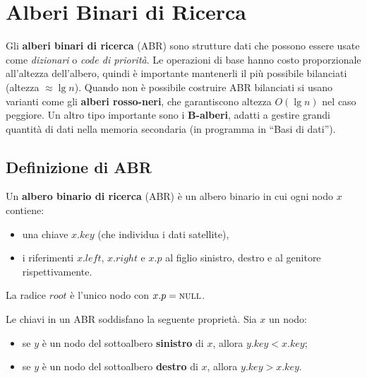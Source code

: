 \section{Alberi Binari di Ricerca}
\label{sec:abr}

\begin{softnote}
	Gli \textbf{alberi binari di ricerca} (ABR) sono strutture dati che possono essere usate
	come \emph{dizionari} o \emph{code di priorità}. Le operazioni di base hanno costo
	proporzionale all'altezza dell'albero, quindi è importante mantenerli il più possibile
	bilanciati (altezza $\approx \lg n$).
	Quando non è possibile costruire ABR bilanciati si usano varianti come gli
	\textbf{alberi rosso-neri}, che garantiscono altezza $O(\lg n)$ nel caso peggiore.
	Un altro tipo importante sono i \textbf{B-alberi}, adatti a gestire grandi quantità di
	dati nella memoria secondaria (in programma in ``Basi di dati'').
\end{softnote}

\subsection{Definizione di ABR}
\label{sub:abr_def}

\begin{definizione}
	Un \textbf{albero binario di ricerca} (ABR) è un albero binario in cui ogni nodo $x$
	contiene:
	\begin{itemize}
		\item una chiave $x.\mathit{key}$ (che individua i dati satellite),
		\item i riferimenti $x.\mathit{left}$, $x.\mathit{right}$ e $x.p$ al figlio sinistro,
		destro e al genitore rispettivamente.
	\end{itemize}
	La radice $\mathit{root}$ è l'unico nodo con $x.p = \textsc{null}$.
\end{definizione}

\begin{definizione}
	Le chiavi in un ABR soddisfano la seguente proprietà. Sia $x$ un nodo:
	\begin{itemize}
		\item se $y$ è un nodo del sottoalbero \textbf{sinistro} di $x$, allora
		$y.\mathit{key} < x.\mathit{key}$;
		\item se $y$ è un nodo del sottoalbero \textbf{destro} di $x$, allora
		$y.\mathit{key} > x.\mathit{key}$.
	\end{itemize}
\end{definizione}

